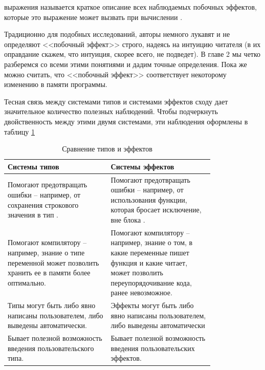 \begin{definition}
	 выражения называется краткое описание всех наблюдаемых побочных эффектов, которые это выражение может вызвать при вычислении \cite{Luc88}.
\end{definition}

Традиционно для подобных исследований, авторы немного лукавят и не определяют <<побочный эффект>> строго, надеясь на интуицию читателя (в их оправдание скажем, что интуиция, скорее всего, не подведет). В главе 2 мы четко разберемся со всеми этими понятиями и дадим точные определения. Пока же можно считать, что <<побочный эффект>> соответствует некоторому изменению в памяти программы.


Тесная связь между системами типов и системами эффектов сходу дает значительное количество полезных наблюдений. Чтобы подчеркнуть двойственность между этими двумя системами, эти наблюдения оформлены в таблицу \ref{types-effects-comparison}

\begin{table}
\begin{tabular}{ | p{0.4\linewidth} | p{0.4\linewidth} | }	
	\hline
	Системы типов & Системы эффектов \\\hline
	
	Помогают предотвращать ошибки -- например, от сохранения строкового значения в тип \code{Int}.
	&
	Помогают предотвращать ошибки -- например, от использования функции, которая бросает исключение, вне блока \code{try-catch}.
	\\\hline
	
	Помогают компилятору -- например, знание о типе переменной может позволить хранить ее в памяти более оптимально.
	&
	Помогают компилятору -- например, знание о том, в какие переменные пишет функция и какие читает, может позволить переупорядочивание кода, ранее невозможное.
	\\\hline
	
	
	Типы могут быть либо явно написаны пользователем, либо выведены автоматически.
	&
	Эффекты могут быть либо явно написаны пользователем, либо выведены автоматически
	\\\hline
	
	
	Бывает полезной возможность введения пользовательского типа.
	&
	Бывает полезной возможность введения пользовательских эффектов.
	\\\hline

\end{tabular}
\label{types-effects-comparison}
\caption{Сравнение типов и эффектов}
\end{table}

